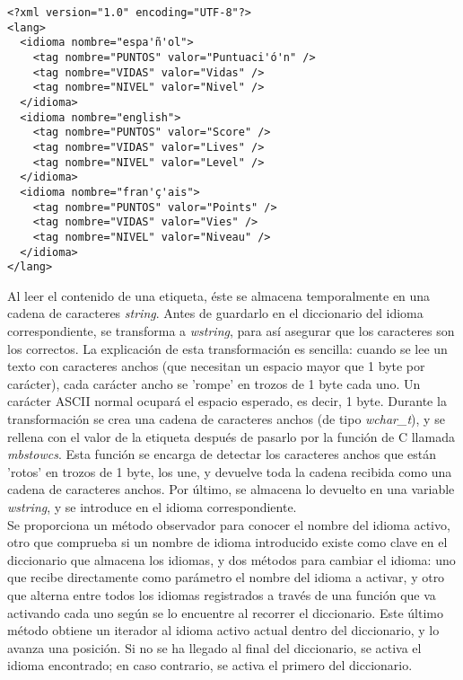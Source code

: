 \begin{lstlisting}[style=XML, texcl=true, escapechar=']
<?xml version="1.0" encoding="UTF-8"?>
<lang>
  <idioma nombre="espa'ñ'ol">
    <tag nombre="PUNTOS" valor="Puntuaci'ó'n" />
    <tag nombre="VIDAS" valor="Vidas" />
    <tag nombre="NIVEL" valor="Nivel" />
  </idioma>
  <idioma nombre="english">
    <tag nombre="PUNTOS" valor="Score" />
    <tag nombre="VIDAS" valor="Lives" />
    <tag nombre="NIVEL" valor="Level" />
  </idioma>
  <idioma nombre="fran'ç'ais">
    <tag nombre="PUNTOS" valor="Points" />
    <tag nombre="VIDAS" valor="Vies" />
    <tag nombre="NIVEL" valor="Niveau" />
  </idioma>
</lang>
\end{lstlisting}

Al leer el contenido de una etiqueta, éste se almacena temporalmente en una cadena de caracteres \emph{string}. Antes de guardarlo en el diccionario del idioma correspondiente, se transforma a \emph{wstring}, para así asegurar que los caracteres son los correctos. La explicación de esta transformación es sencilla: cuando se lee un texto con caracteres anchos (que necesitan un espacio mayor que 1 byte por carácter), cada carácter ancho se 'rompe' en trozos de 1 byte cada uno. Un carácter ASCII normal ocupará el espacio esperado, es decir, 1 byte. Durante la transformación se crea una cadena de caracteres anchos (de tipo \emph{wchar\_t}), y se rellena con el valor de la etiqueta después de pasarlo por la función de C llamada \emph{mbstowcs}. Esta función se encarga de detectar los caracteres anchos que están 'rotos' en trozos de 1 byte, los une, y devuelve toda la cadena recibida como una cadena de caracteres anchos. Por último, se almacena lo devuelto en una variable \emph{wstring}, y se introduce en el idioma correspondiente.\\

Se proporciona un método observador para conocer el nombre del idioma activo, otro que comprueba si un nombre de idioma introducido existe como clave en el diccionario que almacena los idiomas, y dos métodos para cambiar el idioma: uno que recibe directamente como parámetro el nombre del idioma a activar, y otro que alterna entre todos los idiomas registrados a través de una función que va activando cada uno según se lo encuentre al recorrer el diccionario. Este último método obtiene un iterador al idioma activo actual dentro del diccionario, y lo avanza una posición. Si no se ha llegado al final del diccionario, se activa el idioma encontrado; en caso contrario, se activa el primero del diccionario.\\

